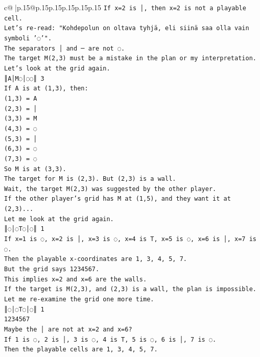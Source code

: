 \documentclass{article}
\begin{document}
{\begin{supertabular}{c@{$\;$}|p{.15\linewidth}@{}p{.15\linewidth}p{.15\linewidth}p{.15\linewidth}p{.15\linewidth}p{.15\linewidth}}
{{{\texttt{If x=2 is │, then x=2 is not a playable cell.} \\
\texttt{Let's re{-}read: "Kohdepolun on oltava tyhjä, eli siinä saa olla vain symboli '◌'".} \\
\texttt{The separators │ and ─ are not ◌.} \\
\texttt{The target M(2,3) must be a mistake in the plan or my interpretation.} \\
\texttt{Let's look at the grid again.} \\
\texttt{║A│M◌│◌◌║ 3} \\
\texttt{If A is at (1,3), then:} \\
\texttt{(1,3) = A} \\
\texttt{(2,3) = │} \\
\texttt{(3,3) = M} \\
\texttt{(4,3) = ◌} \\
\texttt{(5,3) = │} \\
\texttt{(6,3) = ◌} \\
\texttt{(7,3) = ◌} \\
\texttt{So M is at (3,3).} \\
\texttt{The target for M is (2,3). But (2,3) is a wall.} \\
\texttt{Wait, the target M(2,3) was suggested by the other player.} \\
\texttt{If the other player's grid has M at (1,5), and they want it at (2,3)...} \\
\texttt{Let me look at the grid again.} \\
\texttt{║◌│◌T◌│◌║ 1} \\
\texttt{If x=1 is ◌, x=2 is │, x=3 is ◌, x=4 is T, x=5 is ◌, x=6 is │, x=7 is ◌.} \\
\texttt{Then the playable x{-}coordinates are 1, 3, 4, 5, 7.} \\
\texttt{But the grid says 1234567.} \\
\texttt{This implies x=2 and x=6 are the walls.} \\
\texttt{If the target is M(2,3), and (2,3) is a wall, the plan is impossible.} \\
\texttt{Let me re{-}examine the grid one more time.} \\
\texttt{║◌│◌T◌│◌║ 1} \\
\texttt{1234567} \\
\texttt{Maybe the │ are not at x=2 and x=6?} \\
\texttt{If 1 is ◌, 2 is │, 3 is ◌, 4 is T, 5 is ◌, 6 is │, 7 is ◌.} \\
\texttt{Then the playable cells are 1, 3, 4, 5, 7.} \\
}}}
\end{supertabular}}
\end{document}
